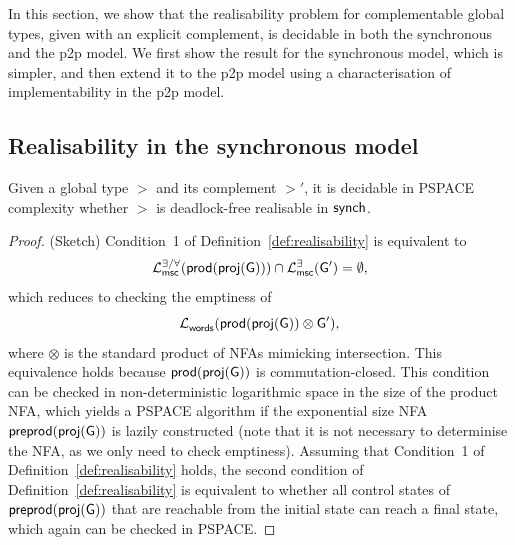 

In this section, we show that the realisability problem for complementable global types,
given with an explicit complement, is decidable in both the synchronous and the p2p model.
We first show the result for the synchronous model, which is simpler,
and then extend it to the p2p model using a characterisation of implementability in the p2p model.

\subsection{Realisability in the synchronous model}

\begin{theorem}
    \label{thm:decidability-of-implementability-in-synch}
    Given a global type $\gt$ and its complement $\gt'$, it is decidable in PSPACE complexity whether  $\gt$ is deadlock-free realisable in $\mathsf{synch}$.    
\end{theorem}

\begin{proof}(Sketch)
    Condition~1 of Definition~\ref{def:realisability}
    is equivalent to $$\mathcal{L}_{\mathsf{msc}}^{\exists/\forall}(\mathsf{prod}(\mathsf{proj}(\mathsf{G}))) \cap \mathcal{L}_{\mathsf{msc}}^{\exists}(\mathsf{G}') = \emptyset,$$
    which reduces to checking the emptiness of $$\mathcal{L}_{\mathsf{words}}^{}(\mathsf{prod}(\mathsf{proj}(\mathsf{G}))\otimes\mathsf{G}'),$$
    where $\otimes$ is the standard product of NFAs mimicking intersection. This equivalence holds 
    because $\mathsf{prod}(\mathsf{proj}(\mathsf{G}))$ is commutation-closed. This condition
    can be checked in non-deterministic logarithmic space in the size of the product NFA,
    which yields a PSPACE algorithm if the exponential size NFA  $\mathsf{preprod}(\mathsf{proj}(\mathsf{G}))$
    is lazily constructed (note that it is not necessary to determinise the NFA, as we only need to check emptiness). 
    Assuming that Condition~1 of Definition~\ref{def:realisability} holds,
    the second condition of Definition~\ref{def:realisability}  is 
    equivalent to whether all control states 
    of $\mathsf{preprod}(\mathsf{proj}(\mathsf{G}))$ that are reachable from the initial state
    can reach a final state, which again can be checked in PSPACE.
\end{proof}

